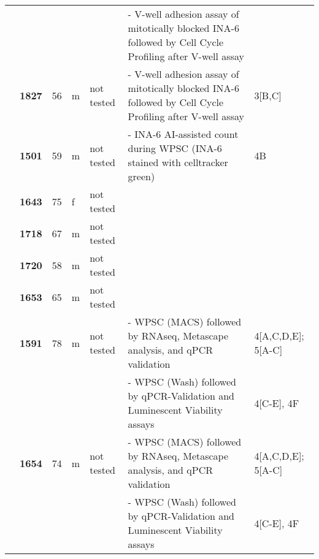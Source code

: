 {\begin{longtable}{|>{\bfseries}p{1.5cm}|>{\bfseries}p{1.2cm}|p{1.2cm}|p{1cm}|p{2.3cm}|p{6cm}|p{1.7cm}|}
     &       &    &   &            & - V-well adhesion assay of mitotically blocked INA-6 followed by Cell Cycle Profiling after V-well assay &                                         \\
    \hhline{~----~~}
     & 1827  & 56 & m & not tested & - V-well adhesion assay of mitotically blocked INA-6 followed by Cell Cycle Profiling after V-well assay & 3[B,C]                                  \\
    \hhline{~------}
     & 1501  & 59 & m & not tested & - INA-6 AI-assisted count during WPSC (INA-6 stained with celltracker green)                             & 4B                                      \\
    \hhline{~----~~}
     & 1643  & 75 & f & not tested &                                                                                                          &                                         \\
    \hhline{~----~~}
    \multirow{3}{1.5cm}{hMSC}
     & 1718  & 67 & m & not tested &                                                                                                          &                                         \\
    \hhline{~----~~}
     & 1720  & 58 & m & not tested &                                                                                                          &                                         \\
    \hhline{~----~~}
     & 1653  & 65 & m & not tested &                                                                                                          &                                         \\
    \hhline{~------}
     & 1591  & 78 & m & not tested & - WPSC (MACS) followed by RNAseq, Metascape analysis, and qPCR validation                                & 4[A,C,D,E]; 5[A-C]                      \\
    \hhline{~~~~~--}
     &       &    &   &            & - WPSC (Wash) followed by qPCR-Validation and Luminescent Viability assays                               & 4[C-E], 4F                              \\
    \hhline{~------}
     & 1654  & 74 & m & not tested & - WPSC (MACS) followed by RNAseq, Metascape analysis, and qPCR validation                                & 4[A,C,D,E]; 5[A-C]                      \\
    \hhline{~~~~~--}
     &       &    &   &            & - WPSC (Wash) followed by qPCR-Validation and Luminescent Viability assays                               & 4[C-E], 4F                              \\

\end{longtable}}
